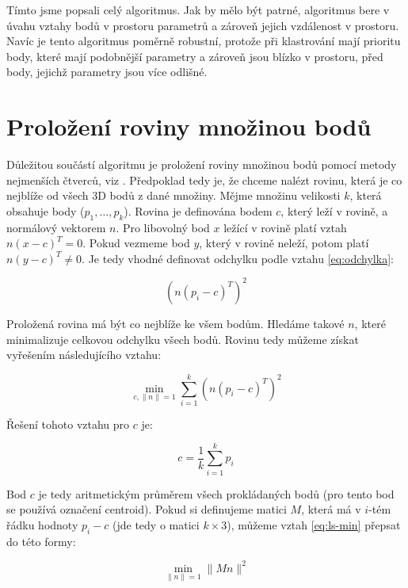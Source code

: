 \documentclass[11pt,twoside,a4paper]{book}
\begin{document}
Tímto jsme popsali celý algoritmus. Jak by mělo být patrné, algoritmus bere v úvahu vztahy bodů v prostoru parametrů a zároveň jejich vzdálenost v prostoru. Navíc je tento algoritmus poměrně robustní, protože při klastrování mají prioritu body, které mají podobnější parametry a zároveň jsou blízko v prostoru, před body, jejichž parametry jsou více odlišné.


\section{Proložení roviny množinou bodů}
\label{sub:lsq}
Důležitou součástí algoritmu je proložení roviny množinou bodů pomocí metody nejmenších čtverců, viz \cite{wiki:leastsq}. Předpoklad tedy je, že chceme nalézt rovinu, která je co nejblíže od všech 3D bodů z dané množiny. Mějme množinu velikosti $k$, která obsahuje body ($p_1, \ldots, p_k$). Rovina je definována bodem $c$, který leží v rovině, a normálový vektorem $n$. Pro libovolný bod $x$ ležící v rovině platí vztah $n(x - c)^T = 0$. Pokud vezmeme bod $y$, který v rovině neleží, potom platí $n(y - c)^T \neq 0$. Je tedy vhodné definovat odchylku podle vztahu \ref{eq:odchylka}:

\begin{equation}
\label{eq:odchylka}
(n (p_i - c)^T)^2
\end{equation}

Proložená rovina má být co nejblíže ke všem bodům. Hledáme takové $n$, které minimalizuje celkovou odchylku všech bodů. Rovinu tedy můžeme získat vyřešením následujícího vztahu:

\begin{equation}
\label{eq:ls-min}
\min_{c,\|n\|=1} \sum\limits_{i=1}^k (n (p_i - c)^T)^2
\end{equation}

Řešení tohoto vztahu pro $c$ je:

\begin{equation}
c = \frac{1}{k} \sum\limits_{i=1}^k p_i
\end{equation}

Bod $c$ je tedy aritmetickým průměrem všech prokládaných bodů (pro tento bod se používá označení centroid). Pokud si definujeme matici $M$, která má v $i$-tém řádku hodnoty $p_i - c$ (jde tedy o matici $k \times 3$), můžeme vztah  \ref{eq:ls-min} přepsat do této formy:

\begin{equation}
\min_{\|n\|=1} \|M n\|^2
\end{equation}
\end{document}
